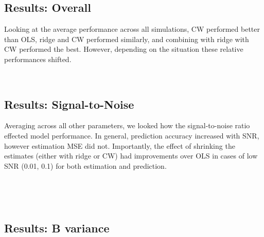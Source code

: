 \documentclass{article}
\begin{document}
    \subsection{Results: Overall}\label{results-overall}

Looking at the average performance across all simulations, CW performed
better than OLS, ridge and CW performed similarly, and combining with
ridge with CW performed the best. However, depending on the situation
these relative performances shifted.



    \begin{center}
    \end{center}
    { \hspace*{\fill} \\}
    
    \subsection{Results: Signal-to-Noise}\label{results-signal-to-noise}

Averaging across all other parameters, we looked how the signal-to-noise
ratio effected model performance. In general, prediction accuracy
increased with SNR, however estimation MSE did not. Importantly, the
effect of shrinking the estimates (either with ridge or CW) had
improvements over OLS in cases of low SNR (0.01, 0.1) for both
estimation and prediction.


    \begin{center}
    \end{center}
    { \hspace*{\fill} \\}
    

    \begin{center}
    \end{center}
    { \hspace*{\fill} \\}
    
    \subsection{Results: B variance}\label{results-b-variance}
\end{document}
